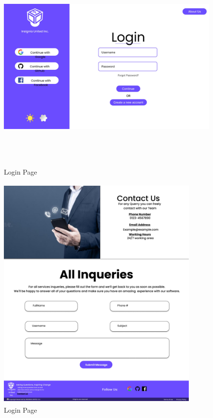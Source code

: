 \begin{figure}[H]
\includegraphics[height=10cm, width=1\textwidth]{./images/prototype/0001}
 \caption{Login Page}
\label{fig:prototype1} 

\includegraphics[height=12cm, width=0.9\textwidth]{./images/prototype/0002}
\centering 
\caption{Login Page}
\label{fig:prototype1}
\end{figure}

